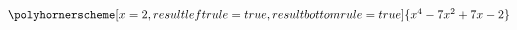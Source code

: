 \documentclass[14pt]{amsart}
\begin{document}
\begin{comment}
\begin{ejemplo}
\item Para encontrar todas las raices enteras del polinomio
$$ x^4-7x^2+7x-2$$
observamos que como el término independiente es $-2$, sus posibles divisores son $1,-1,2,-2$ así que probamos si alguno de ellos es raiz. Esto puede hacerse realizando la división por Ruffini o simplemente evaluando el polinomio
$$\begin{array}{l}
p(1)=1^4-7\cdot 1^2+7\cdot 1-2=-1\\
p(-1)=(-1)^4-7\cdot (-1)^2+7\cdot (-1) -2=1+7-7-2=-1\\
p(2)=2^4-7\cdot 2^2+7\cdot 2-2= 16-28+14-2=0\\
p(-2)=(-2)^4-7\cdot (-2)^2+7\cdot (-2)-2= 16-28-14-2=-28\\
\end{array}
$$
Así que $2$ es raiz del polinomio, para factorizar dividimos por $x-2$:
\end{comment}
 
\begin{preview}
\(
\polyhornerscheme[x=2,resultleftrule=true,resultbottomrule=true]{x^4 - 7x^2 + 7 x - 2}
\)
\end{preview}

\begin{comment}

El cociente es $x^3+2x^2-3x+1$, que solo podría tener como raices enteras a $1$ y $-1$, y ya hemos comprobado que no lo son del polinomio dado, y por tanto tampoco del cociente.

\end{ejemplo} 

\begin{observacion}
Dado un polinomio con coeficientes racionales sus raices son las mismas que las de un polinomio con coeficientes enteros que se obtiene al multiplicar el original por el $mcm$ de todos los denominadores que aparezcan en los coeficientes. Por ejemplo, el polinomio $ x^3+\frac{1}{6}x^2+ \frac{1}{5}x-1$ tiene las mismas raices que $30x^3+5x^2+6x-30$, así que si tuviese raices enteras estarían entre los divisores de $30$.
\end{observacion}

\begin{ejercicio} Factoriza, cuando sea posible, los siguientes polinomios:
\begin{enumerate}
\item $x^3+6x+9x$
\item $x^4-2x^2+1$
\item $x^3+3x^2-4x-12$
\item $x^5+20x^3 +100x$
\item $2x^5-32x$
\item $\frac{2}{5}x^5- \frac{6}{5}x^4+\frac{14}{15}x^2$
\end{enumerate}
\end{ejercicio}
\end{comment}
\end{document}

